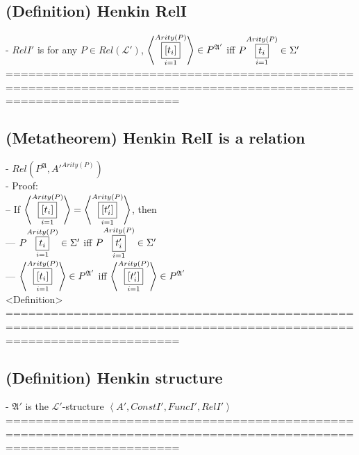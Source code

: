 \documentclass{book}
\newcommand{\means}[2]{#1^{#2}}
\newcommand{\seq}[1]{\left\langle #1 \right\rangle}
\newcommand{\vdc}[3]{\underset{#2}{\overset{#3}{\fbox{$#1$}}}}
\begin{document}
\subsection{(Definition) Henkin RelI}
	- $RelI'$ is for any $P \in Rel(\mathcal{L}')$, $\seq{\vdc{[t_i]}{i=1}{Arity(P)}} \in \means{P}{\mathfrak{A}'}$ iff $P \vdc{t_i}{i=1}{Arity(P)} \in \Sigma'$ \\
	===================================================================================================================
\subsection{(Metatheorem) Henkin RelI is a relation} %
	- $Rel(\means{P}{\mathfrak{A}}, A'^{Arity(P)})$ \\
	- Proof: \\
		-- If $\seq{\vdc{[t_i]}{i=1}{Arity(P)}} = \seq{\vdc{[t'_i]}{i=1}{Arity(P)}}$, then \\
			--- $P \vdc{t_i}{i=1}{Arity(P)} \in \Sigma'$ iff $P \vdc{t'_i}{i=1}{Arity(P)} \in \Sigma'$ \\
			--- $\seq{\vdc{[t_i]}{i=1}{Arity(P)}} \in \means{P}{\mathfrak{A}'}$ iff $\seq{\vdc{[t'_i]}{i=1}{Arity(P)}} \in \means{P}{\mathfrak{A}'}$ \\ <Definition>
	===================================================================================================================
\subsection{(Definition) Henkin structure}
	- $\mathfrak{A}'$ is the $\mathcal{L}'$-structure $\seq{A', ConstI', FuncI', RelI'}$ \\
	===================================================================================================================
\end{document}
